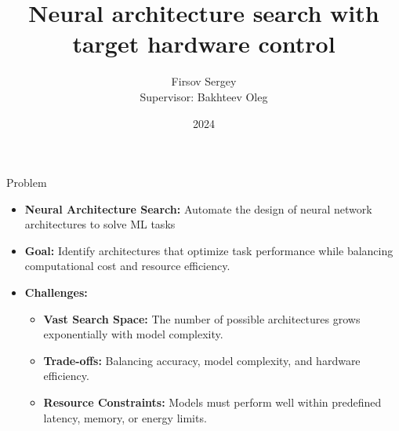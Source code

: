 \documentclass{beamer}
\title{Neural architecture search with target hardware control}
\author{Firsov Sergey \\ Supervisor: Bakhteev Oleg}
\institute{Moscow Institute of Physics and Technology}
\date{2024}
\begin{document}
\begin{frame}
    \titlepage
\end{frame}

\begin{frame}{Problem}
\begin{itemize}
    \item \textbf{Neural Architecture Search:} 
    Automate the design of neural network architectures to solve ML tasks
    \item \textbf{Goal:} Identify architectures that optimize task performance while balancing computational cost and resource efficiency.
    \item \textbf{Challenges:}
    \begin{itemize}
        \item \textbf{Vast Search Space:} The number of possible architectures grows exponentially with model complexity.
        \item \textbf{Trade-offs:} Balancing accuracy, model complexity, and hardware efficiency.
        \item \textbf{Resource Constraints:} Models must perform well within predefined latency, memory, or energy limits.
    \end{itemize}
    
\end{itemize}
\end{frame}
\end{document}
